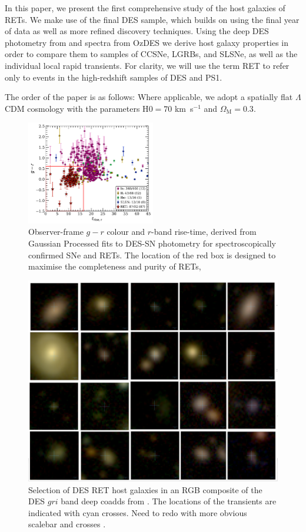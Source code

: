 \documentclass[fleqn,usenatbib,]{mnras}
\newcommand{\phil}[1]{\color{red}#1 \color{black}}
\begin{document}
In this paper, we present the first comprehensive study of the host galaxies of RETs. We make use of the final DES sample, which builds on \citet{Pursiainen2018} using the final year of data as well as more refined discovery techniques. Using the deep DES photometry from \citet{Wiseman2020} and spectra from OzDES \citep{Lidman2020} we derive host galaxy properties in order to compare them to samples of CCSNe, LGRBs, and SLSNe, as well as the individual local rapid transients. For clarity, we will use the term RET to refer only to events in the high-redshift samples of DES and PS1. 

The order of the paper is as follows:
Where applicable, we adopt a spatially flat $\Lambda$CDM cosmology with the parameters H$0=70$ km~s$^{-1}$ and $\Omega_{\textrm{M}}=0.3$.

\begin{figure}
\includegraphics[width=0.5\textwidth]{figs/spec_gr_trise_r_GP5_new_colorscheme.pdf}
\caption{Observer-frame $g-r$ colour and $r$-band rise-time, derived from Gaussian Processed fits to DES-SN photometry for spectroscopically confirmed SNe and  RETs. The location of the red box is designed to maximise the completeness and purity of RETs, 
\label{fig:selection}}
\end{figure}

\begin{figure}
\includegraphics[width=\textwidth]{figs/RET_Mosaic.png}
\caption{Selection of DES RET host galaxies in an RGB composite of the DES $gri$ band deep coadds from \citet{Wiseman2020}. The locations of the transients are indicated with cyan crosses. \phil{Need to redo with more obvious scalebar and crosses}.
\label{fig:mag_dist}}
\end{figure}
\end{document}
